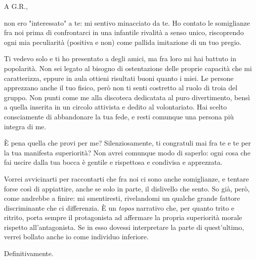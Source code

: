 \documentclass{letter}
\begin{document}
\begin{letter}{}
\opening{A G.R.,}
non ero "interessato" a te: mi sentivo minacciato da te. Ho contato le
somiglianze fra noi prima di confrontarci in una infantile rivalità a senso
unico, riscoprendo ogni mia peculiarità (positiva e non) come pallida imitazione
di un tuo pregio.

Ti vedevo solo e ti ho presentato a degli amici, ma fra loro mi hai battuto in
popolarità. Non sei legato al bisogno di ostentazione delle proprie capacità che
mi caratterizza, eppure in aula ottieni risultati buoni quanto i miei. Le
persone apprezzano anche il tuo fisico, però non ti senti costretto al ruolo di
troia del gruppo. Non punti come me alla discoteca dedicatata al puro
divertimento, bensì a quella inserita in un circolo attivista e dedito al
volontariato. Hai scelto consciamente di abbandonare la tua fede, e resti
comunque una persona più integra di me.

È pena quella che provi per me? Silenziosamente, ti congratuli mai fra te e te
per la tua manifesta superiorità? Non avrei comunque modo di saperlo: ogni cosa
che fai uscire dalla tua bocca è gentile e rispettosa e condivisa e apprezzata.

Vorrei avvicinarti per raccontarti che fra noi ci sono anche somiglianze, e
tentare forse così di appiattire, anche se solo in parte, il dislivello che
sento. So già, però, come andrebbe a finire: mi smentiresti, rivelandomi un
qualche grande fattore discriminante che ci differenzia. È un \textit{topos}
narrativo che, per quanto trito e ritrito, porta sempre il protagonista ad
affermare la propria superiorità morale rispetto all'antagonista. Se in esso
dovessi interpretare la parte di quest'ultimo, verrei bollato anche io come
individuo inferiore.
\closing{Definitivamente.}
\end{letter}
\end{document}
